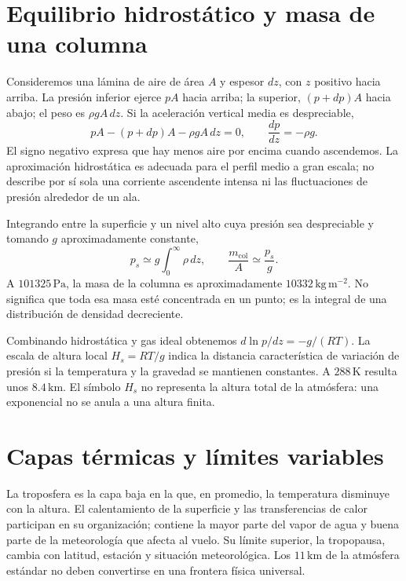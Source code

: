 \section{Equilibrio hidrostático y masa de una columna}
Consideremos una lámina de aire de área $A$ y espesor $dz$, con $z$ positivo hacia arriba. La presión inferior ejerce $pA$ hacia arriba; la superior, $(p+dp)A$ hacia abajo; el peso es $\rho gA\,dz$. Si la aceleración vertical media es despreciable,
\begin{equation}\label{eq:03-hidro}
 pA-(p+dp)A-\rho gA\,dz=0,
 \qquad \frac{dp}{dz}=-\rho g.
\end{equation}
El signo negativo expresa que hay menos aire por encima cuando ascendemos. La aproximación hidrostática es adecuada para el perfil medio a gran escala; no describe por sí sola una corriente ascendente intensa ni las fluctuaciones de presión alrededor de un ala.

Integrando entre la superficie y un nivel alto cuya presión sea despreciable y tomando $g$ aproximadamente constante,
\begin{equation}
 p_s\simeq g\int_0^\infty\rho\,dz,\qquad \frac{m_{\mathrm{col}}}{A}\simeq\frac{p_s}{g}.
\end{equation}
A $101325\,\mathrm{Pa}$, la masa de la columna es aproximadamente $10332\,\mathrm{kg\,m^{-2}}$. No significa que toda esa masa esté concentrada en un punto; es la integral de una distribución de densidad decreciente.

Combinando hidrostática y gas ideal obtenemos $d\ln p/dz=-g/(RT)$. La escala de altura local $H_s=RT/g$ indica la distancia característica de variación de presión si la temperatura y la gravedad se mantienen constantes. A $288\,\mathrm{K}$ resulta unos $8.4\,\mathrm{km}$. El símbolo $H_s$ no representa la altura total de la atmósfera: una exponencial no se anula a una altura finita.

\section{Capas térmicas y límites variables}
La troposfera es la capa baja en la que, en promedio, la temperatura disminuye con la altura. El calentamiento de la superficie y las transferencias de calor participan en su organización; contiene la mayor parte del vapor de agua y buena parte de la meteorología que afecta al vuelo. Su límite superior, la tropopausa, cambia con latitud, estación y situación meteorológica. Los $11\,\mathrm{km}$ de la atmósfera estándar no deben convertirse en una frontera física universal.

